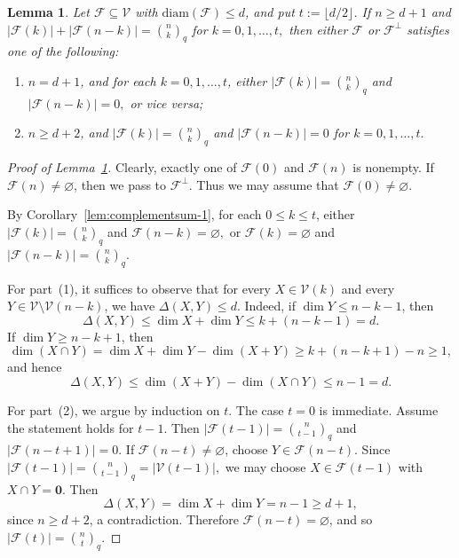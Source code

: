 \documentclass[10pt,a4paper]{amsart}
\newtheorem{lemma}{Lemma}
\newcommand{\diam}{\mathrm{diam}}
\newcommand{\qbinom}[2]{\genfrac{(}{)}{0pt}{}{#1}{#2}_q}
\begin{document}
\begin{lemma}\label{lem:equality}
Let $\mathcal{F} \subseteq \mathcal{V}$ with $\diam(\mathcal{F}) \le d$, and put \(t:=\lfloor d/2\rfloor\).
If $n\ge d+1$ and
\(
|\mathcal{F}(k)|+|\mathcal{F}(n-k)|=\qbinom{n}{k}\)
for \(k=0,1,\ldots,t,\)
then either $\mathcal{F}$ or $\mathcal{F}^\perp$ satisfies one of the following:
\begin{enumerate}
\item[\textup{(1)}]
$n=d+1$, and for each $k=0,1,\ldots,t$, either
\(
|\mathcal{F}(k)|=\qbinom{n}{k}\)
and \(
|\mathcal{F}(n-k)|=0,
\)
or vice versa;

\item[\textup{(2)}]
$n\ge d+2$, and
\(
|\mathcal{F}(k)|=\qbinom{n}{k}\)
and
\(
|\mathcal{F}(n-k)|=0
\)
for \(k=0,1,\ldots,t.\)
\end{enumerate}
\end{lemma}

\begin{proof}[Proof of Lemma~\ref{lem:equality}]
Clearly, exactly one of $\mathcal{F}(0)$ and $\mathcal{F}(n)$ is nonempty. 
If $\mathcal{F}(n)\neq \varnothing$, then we pass to $\mathcal{F}^\perp$. 
Thus we may assume that $\mathcal{F}(0)\neq \varnothing$.

By Corollary~\ref{lem:complementsum-1}, for each $0\le k\le t$, either
\(
|\mathcal{F}(k)|=\qbinom{n}{k}\)
and \(
\mathcal{F}(n-k)=\varnothing,
\)
or
\(
\mathcal{F}(k)=\varnothing\) and
\(
|\mathcal{F}(n-k)|=\qbinom{n}{k}.
\)

For part~(1), it suffices to observe that for every $X\in \mathcal{V}(k)$ and every $Y\in \mathcal{V}\setminus \mathcal{V}(n-k)$, we have $\Delta(X,Y)\le d$. 
Indeed, if $\dim Y\le n-k-1$, then
\[
\Delta(X,Y)\le \dim X+\dim Y\le k+(n-k-1)=d.
\]
If $\dim Y\ge n-k+1$, then
\[
\dim(X\cap Y)
=
\dim X+\dim Y-\dim(X+Y)
\ge
k+(n-k+1)-n
\ge 1,
\]
and hence
\[
\Delta(X,Y)
\le
\dim(X+Y)-\dim(X\cap Y)
\le n-1=d.
\]

For part~(2), we argue by induction on $t$. 
The case $t=0$ is immediate. 
Assume the statement holds for $t-1$. Then
\(
|\mathcal{F}(t-1)|=\qbinom{n}{t-1}\)
and
\(
|\mathcal{F}(n-t+1)|=0.
\)
If $\mathcal{F}(n-t)\neq \varnothing$, choose $Y\in \mathcal{F}(n-t)$. Since
\(
|\mathcal{F}(t-1)|=\qbinom{n}{t-1}=|\mathcal{V}(t-1)|,
\)
we may choose $X\in \mathcal{F}(t-1)$ with $X\cap Y= \boldsymbol 0$. Then
\[
\Delta(X,Y)=\dim X+\dim Y=n-1\ge d+1,
\]
since $n\ge d+2$, a contradiction. Therefore $\mathcal{F}(n-t)=\varnothing$, and so
\(
|\mathcal{F}(t)|=\qbinom{n}{t}.
\)
\qedhere
\end{proof}
\end{document}

